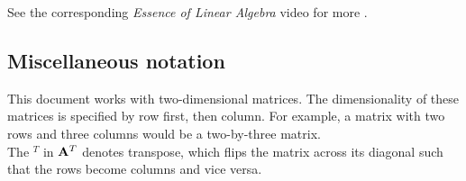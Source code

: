 See the corresponding \textit{Essence of Linear Algebra} video for more
\cite{bib:linalg_eigenvectors_and_eigenvalues}.

\subsection{Miscellaneous notation}

This document works with two-dimensional matrices. The dimensionality of these
matrices is specified by row first, then column. For example, a matrix with two
rows and three columns would be a two-by-three matrix. \\

The $^T$ in $\mathbf{A}^T$ denotes transpose, which flips the matrix across its
diagonal such that the rows become columns and vice versa.
